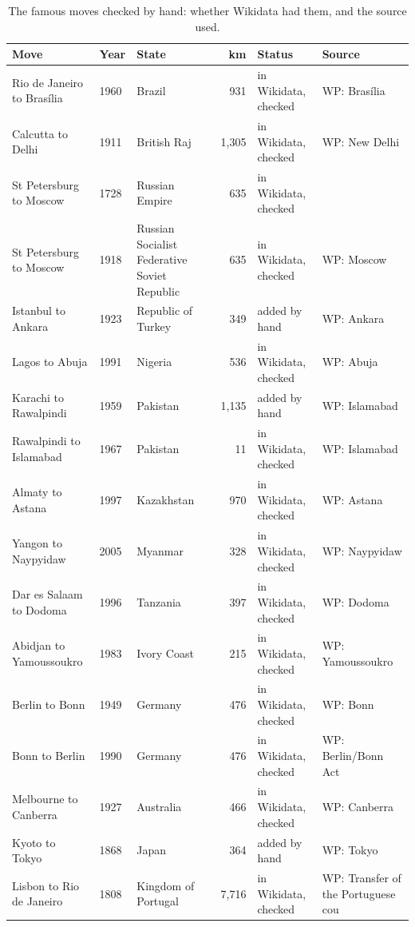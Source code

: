 \documentclass[11pt,a4paper]{article}
\begin{document}
\begin{table}[tbp]\centering\scriptsize\caption{The famous moves checked by hand: whether Wikidata had them, and the source used.}\label{tab:famous}\begin{tabular}{>{\raggedright\arraybackslash}p{3.6cm}l>{\raggedright\arraybackslash}p{3.2cm}r>{\raggedright\arraybackslash}p{2.2cm}>{\raggedright\arraybackslash}p{3.6cm}}\toprule Move & Year & State & km & Status & Source\\\midrule
Rio de Janeiro to Brasília & 1960 & Brazil & 931 & in Wikidata, checked & WP: Brasília\\
Calcutta to Delhi & 1911 & British Raj & 1,305 & in Wikidata, checked & WP: New Delhi\\
St Petersburg to Moscow & 1728 & Russian Empire & 635 & in Wikidata, checked & \\
St Petersburg to Moscow & 1918 & Russian Socialist Federative Soviet Republic & 635 & in Wikidata, checked & WP: Moscow\\
Istanbul to Ankara & 1923 & Republic of Turkey & 349 & added by hand & WP: Ankara\\
Lagos to Abuja & 1991 & Nigeria & 536 & in Wikidata, checked & WP: Abuja\\
Karachi to Rawalpindi & 1959 & Pakistan & 1,135 & added by hand & WP: Islamabad\\
Rawalpindi to Islamabad & 1967 & Pakistan & 11 & in Wikidata, checked & WP: Islamabad\\
Almaty to Astana & 1997 & Kazakhstan & 970 & in Wikidata, checked & WP: Astana\\
Yangon to Naypyidaw & 2005 & Myanmar & 328 & in Wikidata, checked & WP: Naypyidaw\\
Dar es Salaam to Dodoma & 1996 & Tanzania & 397 & in Wikidata, checked & WP: Dodoma\\
Abidjan to Yamoussoukro & 1983 & Ivory Coast & 215 & in Wikidata, checked & WP: Yamoussoukro\\
Berlin to Bonn & 1949 & Germany & 476 & in Wikidata, checked & WP: Bonn\\
Bonn to Berlin & 1990 & Germany & 476 & in Wikidata, checked & WP: Berlin/Bonn Act\\
Melbourne to Canberra & 1927 & Australia & 466 & in Wikidata, checked & WP: Canberra\\
Kyoto to Tokyo & 1868 & Japan & 364 & added by hand & WP: Tokyo\\
Lisbon to Rio de Janeiro & 1808 & Kingdom of Portugal & 7,716 & in Wikidata, checked & WP: Transfer of the Portuguese cou\\

\end{tabular}
\end{table}
\end{document}
